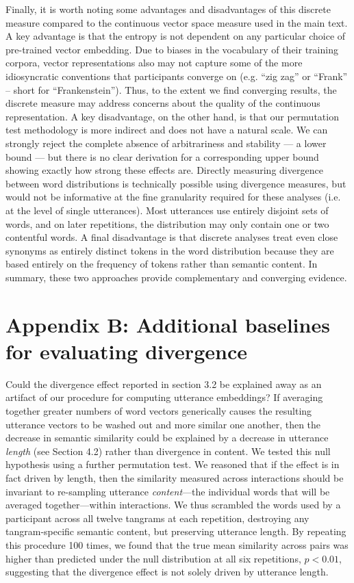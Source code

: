 \documentclass[alpha-refs]{wiley-article}
\begin{document}
Finally, it is worth noting some advantages and disadvantages of this discrete measure compared to the continuous vector space measure used in the main text.
A key advantage is that the entropy is not dependent on any particular choice of pre-trained vector embedding.
Due to biases in the vocabulary of their training corpora, vector representations also may not capture some of the more idiosyncratic conventions that participants converge on (e.g.  ``zig zag'' or ``Frank'' -- short for ``Frankenstein'').
Thus, to the extent we find converging results, the discrete measure may address concerns about the quality of the continuous representation.
A key disadvantage, on the other hand, is that our permutation test methodology is more indirect and does not have a natural scale.
We can strongly reject the complete absence of arbitrariness and stability --- a lower bound --- but there is no clear derivation for a corresponding upper bound showing exactly how strong these effects are.
Directly measuring divergence between word distributions is technically possible using divergence measures, but would not be informative at the fine granularity required for these analyses (i.e. at the level of single utterances).
Most utterances use entirely disjoint sets of words, and on later repetitions, the distribution may only contain one or two contentful words.
A final disadvantage is that discrete analyses treat even close synonyms as entirely distinct tokens in the word distribution because they are based entirely on the frequency of tokens rather than semantic content.
In summary, these two approaches provide complementary and converging evidence.

\section*{Appendix B: Additional baselines for evaluating divergence}

Could the divergence effect reported in section 3.2 be explained away as an artifact of our procedure for computing utterance embeddings?
If averaging together greater numbers of word vectors generically causes the resulting utterance vectors to be washed out and more similar one another, then the decrease in semantic similarity could be explained by a decrease in utterance \emph{length} (see Section 4.2) rather than divergence in content.
We tested this null hypothesis using a further  permutation test.
We reasoned that if the effect is in fact driven by length, then the similarity measured across interactions should be invariant to re-sampling utterance \emph{content}---the individual words that will be averaged together---within interactions.
We thus scrambled the words used by a participant across all twelve tangrams at each repetition, destroying any tangram-specific semantic content, but preserving utterance length.
By repeating this procedure 100 times, we found that the true mean similarity across pairs was higher than predicted under the null distribution at all six repetitions, $p < 0.01$, suggesting that the divergence effect is not solely driven by utterance length.
\end{document}
